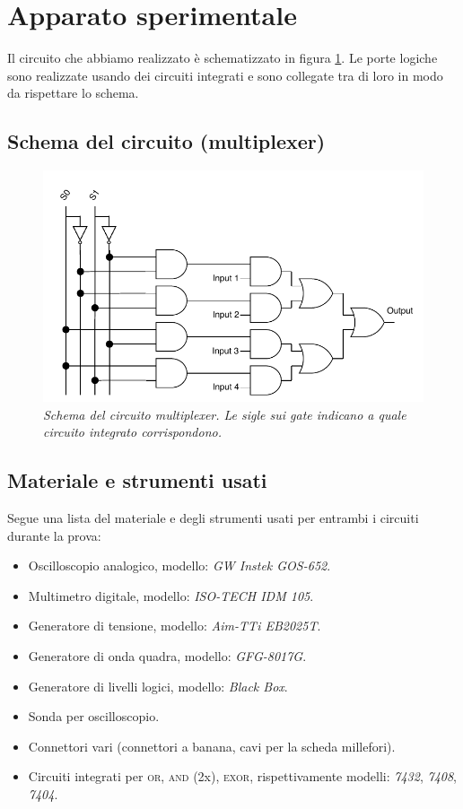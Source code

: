 \section{Apparato sperimentale}\label{sec:apparato-sperimentale}
Il circuito che abbiamo realizzato è schematizzato in figura \ref{fig:circuito}.
Le porte logiche sono realizzate usando dei circuiti integrati e sono collegate tra di loro
in modo da rispettare lo schema.

\subsection{Schema del circuito (multiplexer)}\label{subsec:schema-circuito}
\begin{figure}[h]
\centering
    \includegraphics{../assets/circuito.drawio.pdf}
    \caption{
      \emph{
        Schema del circuito multiplexer. Le sigle sui gate indicano a quale circuito integrato corrispondono.
      }
    }
    \label{fig:circuito}
\end{figure}

\subsection{Materiale e strumenti usati}\label{subsec:materiali}
Segue una lista del materiale e degli strumenti usati per entrambi i circuiti durante la prova:
\begin{itemize}
  \item%
  Oscilloscopio analogico, modello: \emph{GW Instek GOS-652}.
  \item%
  Multimetro digitale, modello: \emph{ISO-TECH IDM 105}.
  \item%
  Generatore di tensione, modello: \emph{Aim-TTi EB2025T}.
  \item%
  Generatore di onda quadra, modello: \emph{GFG-8017G}.
  \item%
  Generatore di livelli logici, modello: \emph{Black Box}.
  \item%
  Sonda per oscilloscopio.
  \item%
  Connettori vari (connettori a banana, cavi per la scheda millefori).
  \item%
  Circuiti integrati per \textsc{or}, \textsc{and} (2x), \textsc{exor}, rispettivamente modelli: \emph{7432}, \emph{7408}, \emph{7404}.
\end{itemize}

